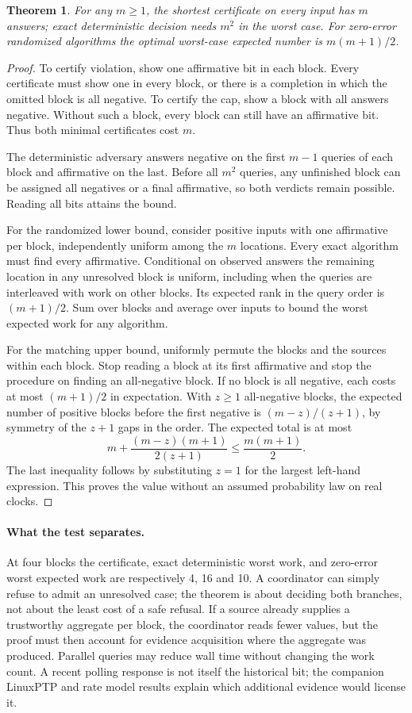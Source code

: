 \documentclass[11pt]{article}
\newtheorem{theorem}{Theorem}
\begin{document}
\begin{theorem}
For any \(m\ge1\), the shortest certificate on every input has
\(m\) answers; exact deterministic decision needs \(m^2\) in the
worst case. For zero-error randomized algorithms the optimal
worst-case expected number is \(m(m+1)/2\).
\end{theorem}
\begin{proof}
To certify violation, show one affirmative bit in each block.
Every certificate must show one in every block, or there
is a completion in which the omitted block is all negative.
To certify the cap, show a block with all answers negative.
Without such a block, every block can still have an affirmative
bit. Thus both minimal certificates cost \(m\).

The deterministic adversary answers negative on the first
\(m-1\) queries of each block and affirmative on the last.
Before all \(m^2\) queries, any unfinished block can be assigned
all negatives or a final affirmative, so both verdicts remain
possible. Reading all bits attains the bound.

For the randomized lower bound, consider positive inputs with
one affirmative per block, independently uniform among the
\(m\) locations. Every exact algorithm must find every affirmative.
Conditional on observed answers the remaining location in any
unresolved block is uniform, including when the queries are
interleaved with work on other blocks. Its expected rank in
the query order is \((m+1)/2\). Sum over blocks and average over
inputs to bound the worst expected work for any algorithm.

For the matching upper bound, uniformly permute the blocks and
the sources within each block. Stop reading a block at its
first affirmative and stop the procedure on finding an
all-negative block. If no block is all negative, each costs
at most \((m+1)/2\) in expectation. With \(z\ge1\) all-negative
blocks, the expected number of positive blocks before the first
negative is \((m-z)/(z+1)\), by symmetry of the \(z+1\) gaps
in the order. The expected total is at most
\[
     m+\frac{(m-z)(m+1)}{2(z+1)}
       \le \frac{m(m+1)}{2}.
\]
The last inequality follows by substituting
\(z=1\) for the largest
left-hand expression. This proves the value without an assumed
probability law on real clocks.
\end{proof}

\paragraph{What the test separates.}
At four blocks the certificate, exact deterministic worst work,
and zero-error worst expected work are respectively 4, 16 and 10.
A coordinator can simply refuse to admit an unresolved case;
the theorem is about deciding both branches, not about the least
cost of a safe refusal. If a source already supplies a trustworthy
aggregate per block, the coordinator reads fewer values, but the
proof must then account for evidence acquisition where the
aggregate was produced. Parallel queries may reduce wall time
without changing the work count. A recent polling response is
not itself the historical bit; the companion LinuxPTP and rate
model results explain which additional evidence would license it.
\end{document}

